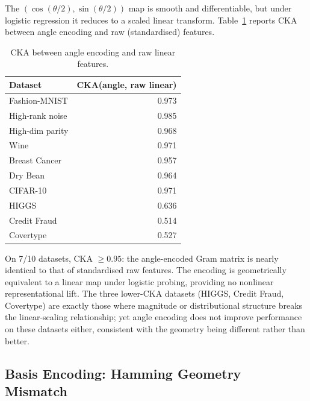\documentclass[12pt]{article}
\begin{document}
The $(\cos(\theta/2), \sin(\theta/2))$ map is smooth and differentiable, but
under logistic regression it reduces to a scaled linear transform.
Table~\ref{tab:cka_angle} reports CKA between angle encoding and raw
(standardised) features.

\begin{table}[tbp]
\centering
\caption{CKA between angle encoding and raw linear features.}
\label{tab:cka_angle}
\small
\begin{tabular}{lr}
\toprule
Dataset & CKA(angle, raw linear) \\
\midrule
Fashion-MNIST   & 0.973 \\
High-rank noise & 0.985 \\
High-dim parity & 0.968 \\
Wine            & 0.971 \\
Breast Cancer   & 0.957 \\
Dry Bean        & 0.964 \\
CIFAR-10        & 0.971 \\
HIGGS           & 0.636 \\
Credit Fraud    & 0.514 \\
Covertype       & 0.527 \\
\bottomrule
\end{tabular}
\end{table}

On 7/10 datasets, CKA $\geq 0.95$: the angle-encoded Gram matrix is nearly
identical to that of standardised raw features.
The encoding is geometrically equivalent to a linear map under logistic
probing, providing no nonlinear representational lift.
The three lower-CKA datasets (HIGGS, Credit Fraud, Covertype) are exactly
those where magnitude or distributional structure breaks the
linear-scaling relationship; yet angle encoding does not improve performance
on these datasets either, consistent with the geometry being different rather
than better.

\subsection{Basis Encoding: Hamming Geometry Mismatch}
\label{sec:basis}
\end{document}
